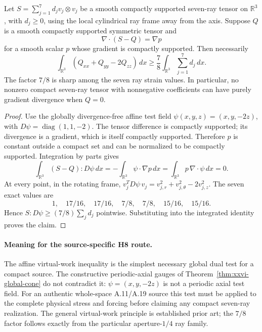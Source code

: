 \begin{proposition}
\label{prop:xxvi-global-virtual-work}
Let $S=\sum_{j=1}^7d_jv_j\otimes v_j$ be a smooth
compactly supported seven-ray tensor on $\mathbb R^3$, with
$d_j\ge0$, using the local cylindrical ray frame away from
the axis. Suppose $Q$ is a smooth compactly supported symmetric
tensor and
\[
\nabla\cdot(S-Q)=\nabla p
\]
for a smooth scalar $p$ whose gradient is compactly supported.
Then necessarily
\begin{equation}\label{eq:xxvi-virtual-work}
\boxed{\quad
\int_{\mathbb R^3}(Q_{xx}+Q_{yy}-2Q_{zz})\,dx
\ge\frac78\int_{\mathbb R^3}\sum_{j=1}^7 d_j\,dx.\quad}
\end{equation}
The factor $7/8$ is sharp among the seven ray strain values.
In particular, no nonzero compact seven-ray tensor with
nonnegative coefficients can have purely gradient divergence
when $Q=0$.
\end{proposition}
\begin{proof}
Use the globally divergence-free affine test field
$\psi(x,y,z)=(x,y,-2z)$, with
$D\psi=\operatorname{diag}(1,1,-2)$.
The tensor difference is compactly supported; its divergence
is a gradient, which is itself compactly supported. Therefore
$p$ is constant outside a compact set and can be normalized
to be compactly supported. Integration by parts gives
\[
\int_{\mathbb R^3}(S-Q):D\psi\,dx
=-\int_{\mathbb R^3}\psi\cdot\nabla p\,dx
=\int_{\mathbb R^3}p\,\nabla\cdot\psi\,dx=0.
\]
At every point, in the rotating frame,
$v_j^TD\psi\,v_j=v_{j,r}^2+v_{j,\theta}^2-2v_{j,z}^2$.
The seven exact values are
\[
1,\quad17/16,\quad17/16,\quad
7/8,\quad7/8,\quad15/16,\quad15/16.
\]
Hence $S:D\psi\ge(7/8)\sum_jd_j$ pointwise.
Substituting into the integrated identity proves the claim.
\end{proof}

\paragraph{Meaning for the source-specific H8 route.}
The affine virtual-work inequality is the simplest necessary
global dual test for a compact source. The constructive
periodic-axial gauges of Theorem~\ref{thm:xxvi-global-cone}
do not contradict it: $\psi=(x,y,-2z)$ is not a periodic
axial test field. For an authentic whole-space A.11/A.19
source this test must be applied to the complete physical
stress and forcing before claiming any compact seven-ray
realization. The general virtual-work principle is established
prior art; the $7/8$ factor follows exactly from the particular
aperture-$1/4$ ray family.
